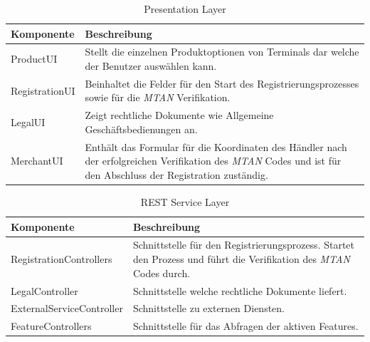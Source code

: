 \begin{table}[H]
	\centering
	\caption{Presentation Layer}
	\begin{tabular}{ | p{4.5cm} | p{10.5cm} | }
		\toprule
		{\textbf{Komponente}} & {\textbf{Beschreibung}} \\
		\midrule
		ProductUI &  Stellt die einzelnen Produktoptionen von Terminals dar welche der Benutzer auswählen kann.\\ \hline
		RegistrationUI  &  Beinhaltet die Felder für den Start des Registrierungsprozesses sowie für die \textit{\gls{MTAN}} Verifikation.\\ \hline
		LegalUI &  Zeigt rechtliche Dokumente wie Allgemeine Geschäftsbedienungen an.\\ \hline
		MerchantUI & Enthält das Formular für die Koordinaten des Händler nach der erfolgreichen Verifikation des \textit{\gls{MTAN}} Codes und ist für den Abschluss der Registration zuständig.\\
		\bottomrule
	\end{tabular}
\end{table}

\begin{table}[H]
	\centering
	\caption{REST Service Layer}
	\begin{tabular}{ | p{4.5cm} | p{10.5cm} | }
		\toprule
		{\textbf{Komponente}} & {\textbf{Beschreibung}} \\
		\midrule
		RegistrationControllers &  Schnittstelle für den Registrierungsprozess. Startet den Prozess und führt die Verifikation des \textit{\gls{MTAN}} Codes durch.\\ \hline
		LegalController &  Schnittstelle welche rechtliche Dokumente liefert. \\ \hline
		ExternalServiceController &  Schnittstelle zu externen Diensten. \\ \hline
		FeatureControllers & Schnittstelle für das Abfragen der aktiven Features. \\
		\bottomrule
	\end{tabular}
\end{table}

